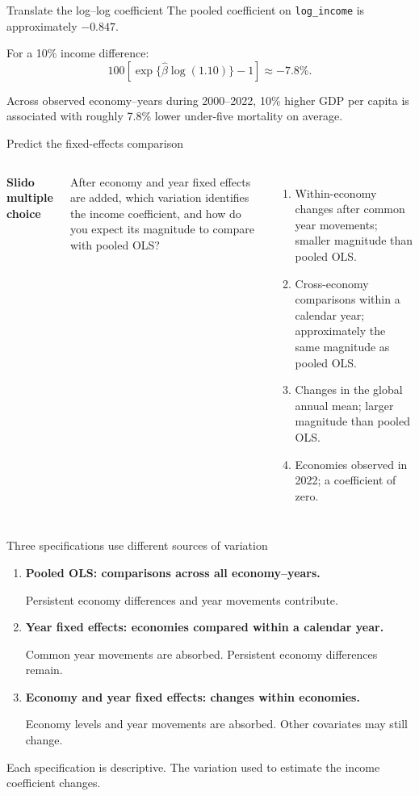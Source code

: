 \begin{frame}{Translate the log--log coefficient}
  The pooled coefficient on \texttt{log\_income} is approximately
  \(-0.847\).

  \vspace{0.5em}
  For a 10\% income difference:
  \[
    100\left[\exp\{\widehat\beta\log(1.10)\}-1\right]
    \approx -7.8\%.
  \]

  Across observed economy--years during 2000--2022, 10\% higher GDP per capita
  is associated with roughly 7.8\% lower under-five mortality on average.

\end{frame}

\begin{frame}{Predict the fixed-effects comparison}
  \begin{columns}[T,onlytextwidth]
      \textbf{Slido multiple choice}

      After economy and year fixed effects are added, which variation identifies
      the income coefficient, and how do you expect its magnitude to compare
      with pooled OLS?
      \begin{enumerate}
        \item Within-economy changes after common year movements; smaller
          magnitude than pooled OLS.
        \item Cross-economy comparisons within a calendar year; approximately
          the same magnitude as pooled OLS.
        \item Changes in the global annual mean; larger magnitude than pooled OLS.
        \item Economies observed in 2022; a coefficient of zero.
      \end{enumerate}
      
  \end{columns}
\end{frame}

\begin{frame}{Three specifications use different sources of variation}
  \begin{enumerate}
    \item \textbf{Pooled OLS: comparisons across all economy--years.}\par
      Persistent economy differences and year movements contribute.
    \item \textbf{Year fixed effects: economies compared within a calendar year.}\par
      Common year movements are absorbed. Persistent economy differences remain.
    \item \textbf{Economy and year fixed effects: changes within economies.}\par
      Economy levels and year movements are absorbed. Other covariates may
      still change.
  \end{enumerate}

  \vfill
  Each specification is descriptive. The variation used to estimate the income
  coefficient changes.
\end{frame}

